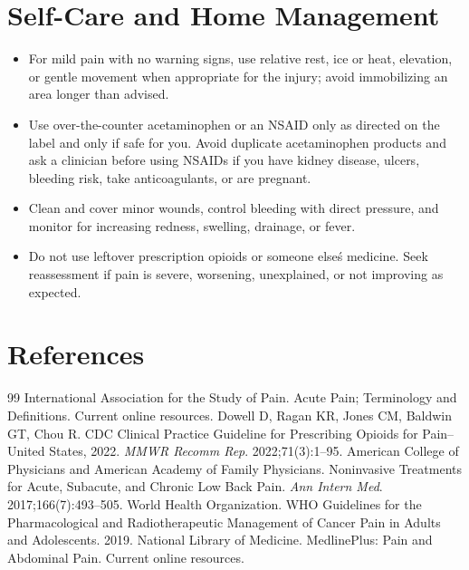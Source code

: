 \section*{Self-Care and Home Management}
\begin{itemize}
 \item For mild pain with no warning signs, use relative rest, ice or heat, elevation, or gentle movement when appropriate for the injury; avoid immobilizing an area longer than advised.
 \item Use over-the-counter acetaminophen or an NSAID only as directed on the label and only if safe for you. Avoid duplicate acetaminophen products and ask a clinician before using NSAIDs if you have kidney disease, ulcers, bleeding risk, take anticoagulants, or are pregnant.
 \item Clean and cover minor wounds, control bleeding with direct pressure, and monitor for increasing redness, swelling, drainage, or fever.
 \item Do not use leftover prescription opioids or someone else\'s medicine. Seek reassessment if pain is severe, worsening, unexplained, or not improving as expected.
\end{itemize}

\section*{References}
\begin{thebibliography}{99}
 International Association for the Study of Pain. Acute Pain; Terminology and Definitions. Current online resources.
 Dowell D, Ragan KR, Jones CM, Baldwin GT, Chou R. CDC Clinical Practice Guideline for Prescribing Opioids for Pain--United States, 2022. \textit{MMWR Recomm Rep}. 2022;71(3):1--95.
 American College of Physicians and American Academy of Family Physicians. Noninvasive Treatments for Acute, Subacute, and Chronic Low Back Pain. \textit{Ann Intern Med}. 2017;166(7):493--505.
 World Health Organization. WHO Guidelines for the Pharmacological and Radiotherapeutic Management of Cancer Pain in Adults and Adolescents. 2019.
 National Library of Medicine. MedlinePlus: Pain and Abdominal Pain. Current online resources.
\end{thebibliography}
